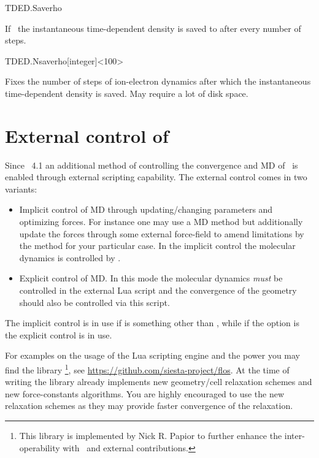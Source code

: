 \begin{fdflogicalF}{TDED.Saverho}

  If \fdftrue\ the instantaneous time-dependent density is saved to
   after every  number of
  steps.

\end{fdflogicalF}

\begin{fdfentry}{TDED.Nsaverho}[integer]<100>

Fixes the number of steps of ion-electron dynamics after which the
instantaneous time-dependent density is saved. May require a lot of
disk space.

\end{fdfentry}

\section{External control of \texorpdfstring{\siesta}{SIESTA}}
\label{sec:lua}

Since \siesta\ 4.1 an additional method of controlling the convergence
and MD of \siesta\ is enabled through external scripting
capability. The external control comes in two variants:
\begin{itemize}
  \item Implicit control of MD through updating/changing parameters
  and optimizing forces. For instance one may use a  MD
  method but additionally update the forces through some external
  force-field to amend limitations by the  method for
  your particular case. In the implicit control the molecular dynamics
  is controlled by \siesta.

  \item Explicit control of MD. In this mode the molecular dynamics
  \emph{must} be controlled in the external Lua script and the
  convergence of the geometry should also be controlled via this
  script.

\end{itemize}

The implicit control is in use if  is something
other than , while if the option is  the explicit
control is in use.

For examples on the usage of the Lua scripting engine and the power
you may find the library \footnote{This library is
    implemented by Nick R. Papior to further enhance the
    inter-operability with \siesta\ and external contributions.}, see
\url{https://github.com/siesta-project/flos}. At the time of writing
the  library already implements new geometry/cell
relaxation schemes and new force-constants algorithms. You are highly
encouraged to use the new relaxation schemes as they may provide
faster convergence of the relaxation.

